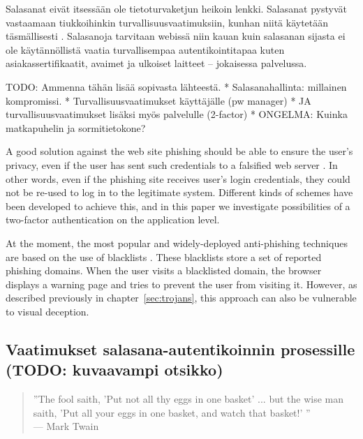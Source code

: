 \documentclass[english,gradu]{tktltiki}
\begin{document}
Salasanat eivät itsessään ole tietoturvaketjun heikoin lenkki. Salasanat pystyvät vastaamaan tiukkoihinkin turvallisuusvaatimuksiin, kunhan niitä käytetään täsmällisesti \cite{will_we_ever_escape_passwords_05}. Salasanoja tarvitaan webissä niin kauan kuin salasanan sijasta ei ole käytännöllistä vaatia turvallisempaa autentikointitapaa kuten asiakassertifikaatit, avaimet ja ulkoiset laitteet -- jokaisessa palvelussa.


TODO: Ammenna tähän lisää sopivasta lähteestä.
* Salasanahallinta: millainen kompromissi.
* Turvallisuusvaatimukset käyttäjälle (pw manager)
* JA turvallisuusvaatimukset lisäksi myös palvelulle (2-factor)
* ONGELMA: Kuinka matkapuhelin ja sormitietokone?

A good solution against the web site phishing should be able to ensure the user's privacy, even if the user has sent such credentials to a falsified web server \cite{phishing_attacks_and_solutions_2007}. In other words, even if the phishing site receives user's login credentials, they could not be re-used to log in to the legitimate system. Different kinds of schemes have been developed to achieve this, and in this paper we investigate possibilities of a two-factor authentication \cite{NIST_SP800-63, schneier_2factor_2005, google_2step_2010} on the application level.

At the moment, the most popular and widely-deployed anti-phishing techniques are based on the use of blacklists \cite{visual_similarity_phishing_2008}. These blacklists store a set of reported phishing domains. When the user visits a blacklisted domain, the browser displays a warning page and tries to prevent the user from visiting it. However, as described previously in chapter~\ref{sec:trojans}, this approach can also be vulnerable to visual deception.



\subsection{Vaatimukset salasana-autentikoinnin prosessille (TODO: kuvaavampi otsikko)} %
\label{sub:vaatimukset_salasana_autentikoinnin_prosessille_todo_kuvaavampi_otsikko_}

           \begin{quote}
               ''The fool saith, 'Put not all thy eggs in one basket' ...
               but the wise man saith, 'Put all your eggs in one basket, and watch that basket!' ''
               \\--- Mark Twain \cite{twain_eggs_1894}
           \end {quote}
\end{document}
